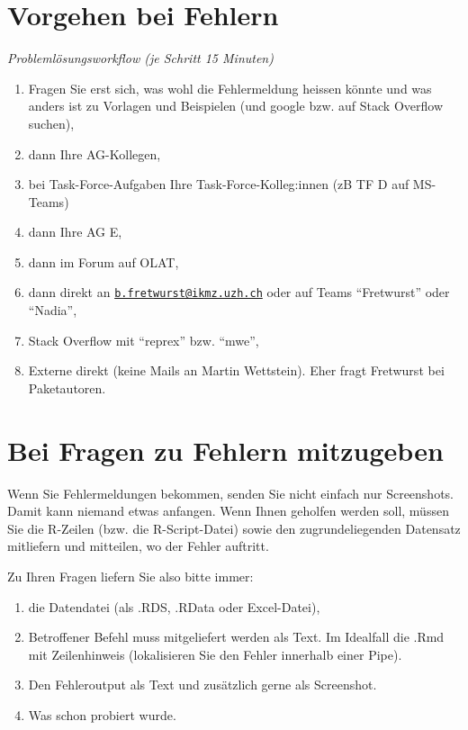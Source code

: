 \documentclass[twoside, pagesize, fontsize=11pt, dvipsnames]{scrreport}
\begin{document}
\hypertarget{vorgehen-bei-fehlern}{%
\section{Vorgehen bei Fehlern}\label{vorgehen-bei-fehlern}}

\emph{Problemlösungsworkflow (je Schritt 15 Minuten)}

\begin{enumerate}
\def\labelenumi{\arabic{enumi}.}
\item
  Fragen Sie erst sich, was wohl die Fehlermeldung heissen könnte und
  was anders ist zu Vorlagen und Beispielen (und google bzw. auf Stack
  Overflow suchen),
\item
  dann Ihre AG-Kollegen,
\item
  bei Task-Force-Aufgaben Ihre Task-Force-Kolleg:innen (zB TF D auf
  MS-Teams)
\item
  dann Ihre AG E,
\item
  dann im Forum auf OLAT,
\item
  dann direkt an
  \href{mailto:b.fretwurst@ikmz.uzh.ch}{\nolinkurl{b.fretwurst@ikmz.uzh.ch}}
  oder auf Teams \enquote{Fretwurst} oder \enquote{Nadia},
\item
  Stack Overflow mit \enquote{reprex} bzw. \enquote{mwe},
\item
  Externe direkt (keine Mails an Martin Wettstein). Eher fragt Fretwurst
  bei Paketautoren.
\end{enumerate}

\hypertarget{bei-fragen-zu-fehlern-mitzugeben}{%
\section{Bei Fragen zu Fehlern
mitzugeben}\label{bei-fragen-zu-fehlern-mitzugeben}}

Wenn Sie Fehlermeldungen bekommen, senden Sie nicht einfach nur
Screenshots. Damit kann niemand etwas anfangen. Wenn Ihnen geholfen
werden soll, müssen Sie die R-Zeilen (bzw. die R-Script-Datei) sowie den
zugrundeliegenden Datensatz mitliefern und mitteilen, wo der Fehler
auftritt.

Zu Ihren Fragen liefern Sie also bitte immer:

\begin{enumerate}
\def\labelenumi{\arabic{enumi}.}
\item
  die Datendatei (als .RDS, .RData oder Excel-Datei),
\item
  Betroffener Befehl muss mitgeliefert werden als Text. Im Idealfall die
  .Rmd mit Zeilenhinweis (lokalisieren Sie den Fehler innerhalb einer
  Pipe).
\item
  Den Fehleroutput als Text und zusätzlich gerne als Screenshot.
\item
  Was schon probiert wurde.
\end{enumerate}
\end{document}

